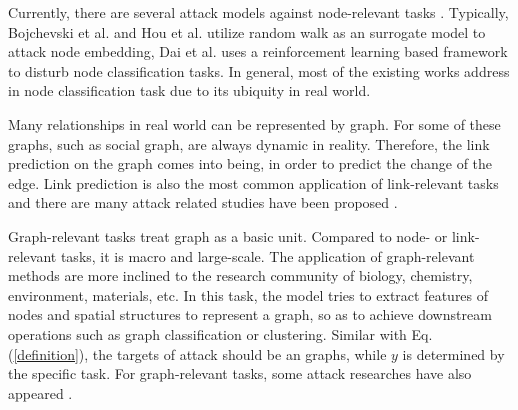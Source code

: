 Currently, there are several attack models against node-relevant tasks \cite{zugner2018adversarial,bojchevski2019adversarial,xu2019topology,zugner2019adversarial,wang2018attack,chen2018fast,dai2018adversarial,dai2018adversarial,xuan2019unsupervised,bose2019generalizable,wang2019attacking,waniek2018attack,chen2018link,sun2018data,zhou2019attacking,wu2019adversarial}. Typically, Bojchevski et al. and Hou et al. \cite{bojchevski2019adversarial,hou2019alphacyber} utilize random walk \cite{perozzi2014deepwalk} as an surrogate model to attack node embedding,  Dai et al. \cite{dai2018adversarial} uses a reinforcement learning based framework to disturb node classification tasks. In general, most of the existing works address in node classification task due to its ubiquity in real world.

Many relationships in real world can be represented by graph. For some of these graphs, such as social graph, are always dynamic in reality. Therefore, the link prediction on the graph comes into being, in order to predict the change of the edge. Link prediction is also the most common application of link-relevant tasks and there are many attack related studies have been proposed \cite{chen2018link,waniek2018attack,zhou2019attacking,sun2018data,zhou2019attacking,chen2019data,christakopoulou2018adversarial,chen2019time}.

Graph-relevant tasks treat graph as a basic unit. Compared to node- or link-relevant tasks, it is macro and large-scale. The application of graph-relevant methods are more inclined to the research community of biology, chemistry, environment, materials, etc. In this task, the model tries to extract features of nodes and spatial structures to represent a graph, so as to achieve downstream operations such as graph classification or clustering. Similar with  Eq.(\ref{definition}), the targets of attack should be an graphs, while $y$ is determined by the specific task. For graph-relevant tasks, some attack researches have also appeared \cite{ma2019attacking,chen2019ga,chen2017practical}.

